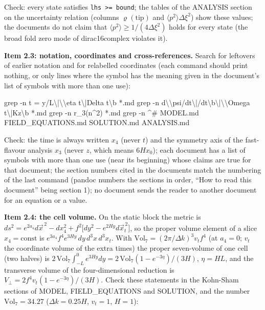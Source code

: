 \documentclass[
  10pt,
]{article}
\newenvironment{Shaded}{}{}
\newcommand{\NormalTok}[1]{#1}
\begin{document}
Check: every state satisfies \texttt{lhs\ \textgreater{}=\ bound}; the
tables of the ANALYSIS section on the uncertainty relation (columns
\(\varrho(\text{tip})\) and \(\langle p^2\rangle\Delta\xi^2\)) show
these values; the documents do not claim that
\(\langle p^2\rangle \ge 1/(4\Delta\xi^2)\) holds for every state (the
broad fold zero mode of dirac16complex violates it).

\textbf{Item 2.3: notation, coordinates and cross-references.} Search
for leftovers of earlier notation and for relabelled coordinates (each
command should print nothing, or only lines where the symbol has the
meaning given in the document's list of symbols with more than one use):

\begin{Shaded}
\begin{Highlighting}[]
\NormalTok{grep {-}n \textquotesingle{}t = y/L\textbackslash{}|\textbackslash{}\textbackslash{}eta t\textbackslash{}|Delta t\textbackslash{}b\textquotesingle{} *.md}
\NormalTok{grep {-}n \textquotesingle{}d\textbackslash{}\textbackslash{}psi/dt\textbackslash{}|/dt\textbackslash{}b\textbackslash{}|\textbackslash{}\textbackslash{}Omega t\textbackslash{}|Kz\textbackslash{}b\textquotesingle{} *.md}
\NormalTok{grep {-}n \textquotesingle{}r\_3(n\^{}2)\textquotesingle{} *.md}
\NormalTok{grep {-}n \textquotesingle{}\^{}\#\textquotesingle{} MODEL.md FIELD\_EQUATIONS.md SOLUTION.md ANALYSIS.md}
\end{Highlighting}
\end{Shaded}

Check: the time is always written \(x_4\) (never \(t\)) and the symmetry
axis of the fast-flavour analysis \(x_3\) (never \(z\), which means
\(6Hx_0\)); each document has a list of symbols with more than one use
(near its beginning) whose claims are true for that document; the
section numbers cited in the documents match the numbering of the last
command (pandoc numbers the sections in order, ``How to read this
document'' being section 1); no document sends the reader to another
document for an equation or a value.

\textbf{Item 2.4: the cell volume.} On the static block the metric is
\(ds^2 = e^{2a_4}d\vec x^{\,2} - dx_4^2 + f^2\big[dy^2 - e^{2Hy}d\vec x_t^{\,2}\big]\),
so the proper volume element of a slice \(x_4 = \text{const}\) is
\(e^{3a_4}f^4e^{3Hy}\,dy\,d^3x\,d^3x_t\). With
\(\mathrm{Vol}_7 = (2\pi/\Delta k)^3v_tf^4\) (at \(a_4 = 0\); \(v_t\)
the coordinate volume of the extra times) the proper seven-volume of one
cell (two halves) is
\(2\,\mathrm{Vol}_7\int_{-L}^{0}e^{3Hy}dy = 2\,\mathrm{Vol}_7(1 - e^{-3\eta})/(3H)\),
\(\eta = HL\), and the transverse volume of the four-dimensional
reduction is \(V_\perp = 2f^4v_t(1 - e^{-3\eta})/(3H)\). Check these
statements in the Kohn-Sham sections of MODEL, FIELD\_EQUATIONS and
SOLUTION, and the number \(\mathrm{Vol}_7 = 34.27\)
(\(\Delta k = 0.25H\), \(v_t = 1\), \(H = 1\)):
\end{document}
